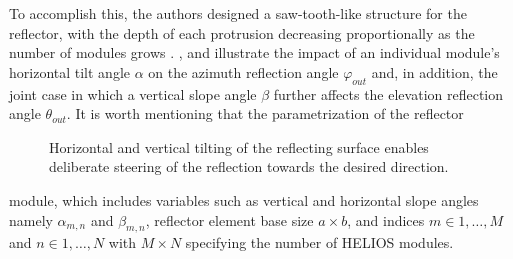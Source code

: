 To accomplish this, the authors designed a saw-tooth-like structure for the reflector, with the depth of each protrusion decreasing proportionally as the number of modules grows \cite{Helios}. , and  illustrate the impact of an individual module's horizontal tilt angle $\alpha$ on the azimuth reflection angle $\varphi_{out}$ and, in addition, the joint case in which a vertical slope angle $\beta$ further affects the elevation reflection angle $\theta_{out}$. It is worth mentioning that the parametrization of the reflector
\begin{figure}[H]
	\centering
	\hfill
	\hfill
	\caption[Horizontal and vertical tilting of the reflecting surface enables deliberate steering of the reflection towards the desired direction.]{Horizontal and vertical tilting of the reflecting surface enables deliberate steering of the reflection towards the desired direction. }
	\label{fig:trisuq}
\end{figure}
module, which includes variables such as vertical and horizontal slope angles namely $\alpha_{m,n}$ and $\beta_{m,n}$, reflector element base size $a \times b$, and indices $m \in 1, \dots, M$ and $n \in 1, \dots, N$ with $M \times N$ specifying the number of HELIOS modules.
